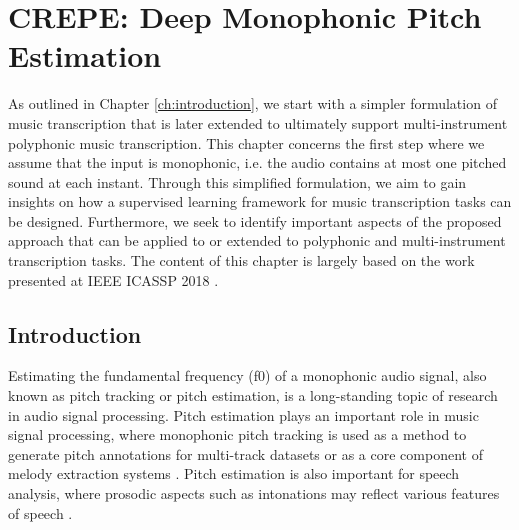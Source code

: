 
\graphicspath{{4-monophonic/figures/}}

\chapter{CREPE: Deep Monophonic Pitch Estimation}
\label{ch:monophonic}

As outlined in Chapter \ref{ch:introduction}, we start with a simpler formulation of music transcription that is later extended to ultimately support multi-instrument polyphonic music transcription.
This chapter concerns the first step where we assume that the input is monophonic, i.e. the audio contains at most one pitched sound at each instant.
Through this simplified formulation, we aim to gain insights on how a supervised learning framework for music transcription tasks can be designed.
Furthermore, we seek to identify important aspects of the proposed approach that can be applied to or extended to polyphonic and multi-instrument transcription tasks.
The content of this chapter is largely based on the work presented at IEEE ICASSP 2018 \cite{kim2018crepe}.

\section{Introduction}\label{sec:introduction}

Estimating the fundamental frequency (f0) of a monophonic audio signal, also known as pitch tracking or pitch estimation, is a long-standing topic of research in audio signal processing.
Pitch estimation plays an important role in music signal processing, where monophonic pitch tracking is used as a method to generate pitch annotations for multi-track datasets \cite{bittner2014medleydb} or as a core component of melody extraction systems \cite{bosch2014melody, mauch2015computer}. 
Pitch estimation is also important for speech analysis, where prosodic aspects such as intonations may reflect various features of speech \cite{zubizarreta1998prosody}.

